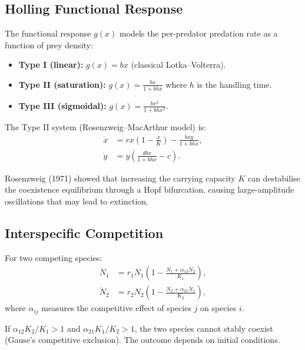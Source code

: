 \subsection{Holling Functional Response}

\begin{definition}
The functional response $g(x)$ models the per-predator predation rate
as a function of prey density:
\begin{itemize}
  \item \textbf{Type I (linear):} $g(x)=bx$ (classical Lotka--Volterra).
  \item \textbf{Type II (saturation):} $g(x)=\frac{bx}{1+bhx}$
    where $h$ is the handling time.
  \item \textbf{Type III (sigmoidal):} $g(x)=\frac{bx^2}{1+bhx^2}$.
\end{itemize}
\end{definition}

The Type II system (Rosenzweig--MacArthur model) is:
\begin{align}
  \dot{x} &= rx\left(1-\frac{x}{K}\right) - \frac{bxy}{1+bhx}, \\
  \dot{y} &= y\left(\frac{dbx}{1+bhx} - c\right).
\end{align}

\begin{warning}[title=\textbf{Paradox of enrichment}]
Rosenzweig (1971) showed that increasing the carrying capacity $K$
can destabilise the coexistence equilibrium through a Hopf
bifurcation, causing large-amplitude oscillations that may lead to
extinction.
\end{warning}

\subsection{Interspecific Competition}

\begin{definition}
For two competing species:
\begin{align}
  \dot{N}_1 &= r_1 N_1\left(1 - \frac{N_1 + \alpha_{12}N_2}{K_1}\right), \\
  \dot{N}_2 &= r_2 N_2\left(1 - \frac{N_2 + \alpha_{21}N_1}{K_2}\right),
\end{align}
where $\alpha_{ij}$ measures the competitive effect of species $j$ on
species $i$.
\end{definition}

\begin{proposition}
If $\alpha_{12}K_2/K_1 > 1$ and $\alpha_{21}K_1/K_2 > 1$, the two
species cannot stably coexist (Gause's competitive exclusion).  The
outcome depends on initial conditions.
\end{proposition}

